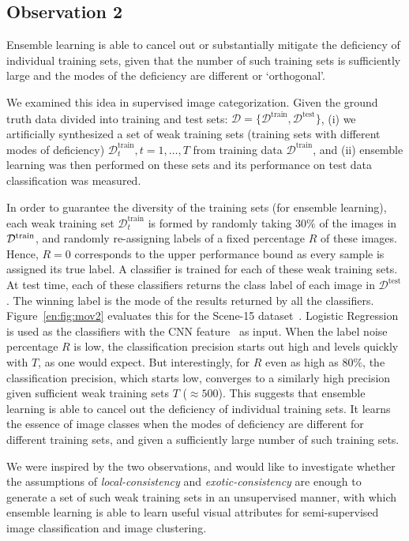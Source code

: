 \subsection{Observation 2}
\label{en:sec:mov2}
Ensemble learning is able to cancel out or  substantially mitigate the
deficiency of individual training sets, given that the number of such
training sets is sufficiently large and the modes of the deficiency
are different or `orthogonal'. 

We examined this idea in supervised
image categorization.  Given the ground truth data divided into training
and test sets: $\mathcal D = \{\mathcal{D}^\text{train} ,
\mathcal{D}^\text{test}\}$, (i) we artificially synthesized a set of
weak training sets (training sets with different modes of deficiency)
$\mathcal{D}^\text{train}_t, t=1,\ldots,T$ from training data
$\mathcal{D}^\text{train}$, and (ii) ensemble learning was then
performed on these sets and its performance on test data
classification was measured.

In order to guarantee the diversity of the training sets (for ensemble
learning), each weak training set $\mathcal{D}^\text{train}_t$ is
formed by randomly taking $30\%$ of the images in $\mathcal{D}^\text{train}$, and
randomly re-assigning labels of a fixed percentage $R$ of these
images. Hence, $R=0$ corresponds to the upper performance bound as
every sample is assigned its true label.  A classifier is trained for
each of these weak training sets.  At test time, each of these
classifiers returns the class label of each image in
$\mathcal{D}^\text{test}$. The winning label is the mode of the
results returned by all the classifiers.  Figure~\ref{en:fig:mov2}
evaluates this for the Scene-15
dataset~\citep{lazebnik:cvpr06}. Logistic Regression is used as the
classifiers with the CNN feature~\citep{deep:bmvc14} as
input.  When the label noise percentage $R$ is low, the classification
precision starts out high and levels quickly with $T$, as one would
expect. But interestingly, for $R$ even as high as $80\%$, the
classification precision, which starts low, converges to a similarly
high precision given sufficient weak training sets $T$ ($\approx
500$).  This suggests that ensemble learning is able to cancel out the
deficiency of individual training sets. It learns the essence of image
classes when the modes of deficiency are different for different
training sets, and given a sufficiently large number of such training sets.

We were inspired by the two observations, and would like to
investigate whether the assumptions of \emph{local-consis\-tency} and
\emph{exotic-consistency} are enough to generate a set of such weak
training sets in an unsupervised manner, with which ensemble learning
is able to learn useful visual attributes for semi-supervised
image classification and image clustering.

